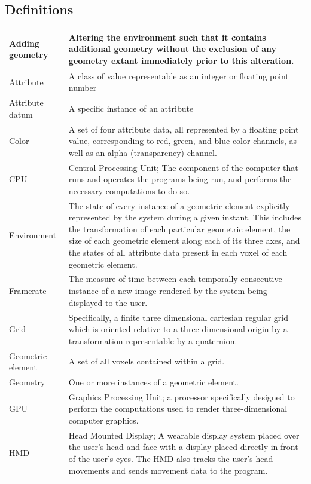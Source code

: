 \documentclass[onecolumn, draftclsnofoot,10pt, compsoc]{IEEEtran}
\begin{document}
\subsection{Definitions}
\begin{longtable}{ | l | p{12cm} | }
 \hline			
Adding geometry & Altering the environment such that it contains additional geometry without the exclusion of any geometry extant immediately prior to this alteration.  \\ \hline 
Attribute & A class of value representable as an integer or floating point number  \\ \hline
Attribute datum & A specific instance of an attribute  \\ \hline
Color & A set of four attribute data, all represented by a floating point value, corresponding to red, green, and blue color channels, as well as an alpha (transparency) channel.  \\ \hline
CPU & Central Processing Unit; The component of the computer that runs and operates the programs being run, and performs the necessary computations to do so.  \\ \hline
Environment & The state of every instance of a geometric element explicitly represented by the system during a given instant. This includes the transformation of each particular geometric element, the size of each geometric element along each of its three axes, and the states of all attribute data present in each voxel of each geometric element. \\ \hline
Framerate & The measure of time between each temporally consecutive instance of a new image rendered by the system being displayed to the user. \\ \hline 
Grid &  Specifically, a finite three dimensional cartesian regular grid which is oriented relative to a three-dimensional origin by a transformation representable by a quaternion. \\ \hline
Geometric element & A set of all voxels contained within a grid.  \\ \hline
Geometry & One or more instances of a geometric element.  \\ \hline
GPU & Graphics Processing Unit; a processor specifically designed to perform the computations used to render three-dimensional computer graphics.  \\ \hline
HMD & Head Mounted Display; A wearable display system placed over the user’s head and face with a display placed directly in front of the user’s eyes. The HMD also tracks the user’s head movements and sends movement data to the program.  \\ \hline

\end{longtable}
\end{document}
